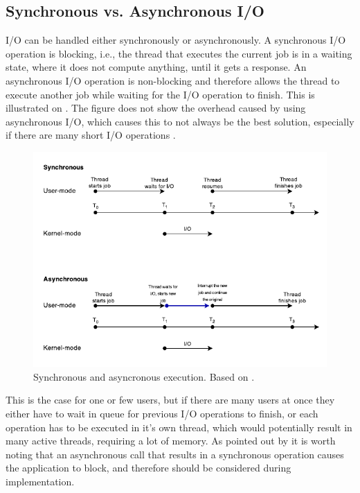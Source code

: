 

\subsection{Synchronous vs. Asynchronous I/O}
I/O can be handled either synchronously or asynchronously. A synchronous I/O operation is blocking, i.e., the thread that executes the current job is in a waiting state, where it does not compute anything, until it gets a response. An asynchronous I/O operation is non-blocking and therefore allows the thread to execute another job while waiting for the I/O operation to finish. This is illustrated on . The figure does not show the overhead caused by using asynchronous I/O, which causes this to not always be the best solution, especially if there are many short I/O operations \cite{ms-syn-asyn}.

\begin{figure}[H]
  \centering
  \includegraphics[scale=1.2]{billeder/sync-async.pdf}  
  \caption{Synchronous and asyncronous execution. Based on \cite{ms-syn-asyn}.}
  \label{fig:syncasync}
\end{figure}

This is the case for one or few users, but if there are many users at once they either have to wait in queue for previous I/O operations to finish, or each operation has to be executed in it's own thread, which would potentially result in many active threads, requiring a lot of memory. As pointed out by \citet{amir} it is worth noting that an asynchronous call that results in a synchronous operation causes the application to block, and therefore should be considered during implementation.

